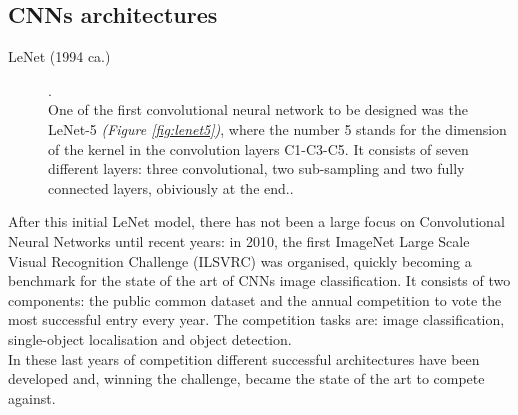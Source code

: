 \documentclass[../main.tex]{subfiles}
\begin{document}
\vspace{5mm}
\subsection{CNNs architectures}

\begin{description}
\item[LeNet (1994 ca.)] \cite{LeCun1998}. \hfill \\
One of the first convolutional neural network to be designed was the LeNet-5 \textit{(Figure \ref{fig:lenet5})}, where the number 5 stands for the dimension of the kernel in the convolution layers C1-C3-C5. It consists of seven different layers: three convolutional, two sub-sampling and two fully connected layers, obiviously at the end.\cite{LeCun1998}. 
\end{description}



After this initial LeNet model, there has not been a large focus on Convolutional Neural Networks until recent years: in 2010, the first ImageNet Large Scale Visual Recognition Challenge (ILSVRC) was organised\cite{Russakovsky}, quickly becoming a benchmark for the state of the art of CNNs image classification. It consists of two components: the public common dataset and the annual competition to vote the most successful entry every year. The competition tasks are: image classification, single-object localisation and object detection.\cite{Russakovsky} \\
In these last years of competition different successful architectures have been developed and, winning the challenge, became the state of the art to compete against.
\clearpage
\newpage
\end{document}
